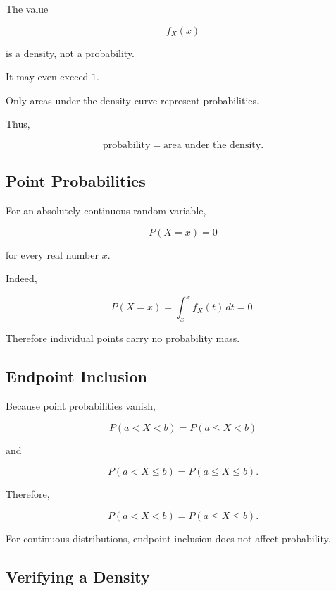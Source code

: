 The value

\[
f_X(x)
\]

is a density, not a probability.

It may even exceed \(1\).

Only areas under the density curve represent probabilities.

Thus,

\[
\boxed{
\text{probability}
=
\text{area under the density}.
}
\]

\subsection{Point Probabilities}
\label{subsec:continuous-point-probabilities}

For an absolutely continuous random variable,

\[
\boxed{
P(X=x)=0
}
\]

for every real number \(x\).

Indeed,

\[
P(X=x)
=
\int_x^x f_X(t)\,dt
=
0.
\]

Therefore individual points carry no probability mass.

\subsection{Endpoint Inclusion}
\label{subsec:continuous-endpoint-inclusion}

Because point probabilities vanish,

\[
P(a<X<b)
=
P(a\leq X<b)
\]

and

\[
P(a<X\leq b)
=
P(a\leq X\leq b).
\]

Therefore,

\[
\boxed{
P(a<X<b)
=
P(a\leq X\leq b).
}
\]

For continuous distributions, endpoint inclusion does not affect
probability.

\subsection{Verifying a Density}
\label{subsec:verifying-density}

